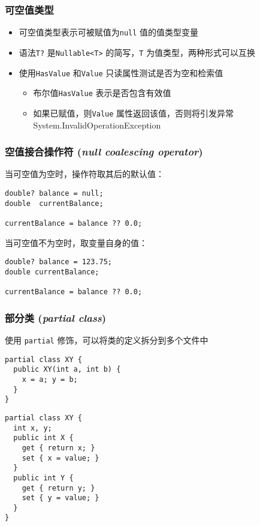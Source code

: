 \begin{frame}[fragile]
\frametitle{可空值类型}
\begin{itemize}
\item 可空值类型表示可被赋值为\texttt{null} 值的值类型变量
\item 语法\texttt{T?} 是\lstinline|Nullable<T>| 的简写，\texttt{T} 为值类型，两种形式可以互换
\item 使用\texttt{HasValue} 和\texttt{Value} 只读属性测试是否为空和检索值
\begin{itemize}
\item 布尔值\texttt{HasValue} 表示是否包含有效值
\item 如果已赋值，则\texttt{Value} 属性返回该值，否则将引发异常 System.InvalidOperationException 
\end{itemize}
\end{itemize}
\end{frame}

\begin{frame}[fragile]
\frametitle{空值接合操作符 (\textit{null coalescing operator})}
当可空值为空时，操作符取其后的默认值：
\begin{lstlisting}
double? balance = null;
double  currentBalance;

currentBalance = balance ?? 0.0;
\end{lstlisting}

当可空值不为空时，取变量自身的值：
\begin{lstlisting}
double? balance = 123.75;
double currentBalance;

currentBalance = balance ?? 0.0;
\end{lstlisting}
\end{frame}

\begin{frame}[fragile]
\frametitle{部分类 (\textit{partial class})}
使用 \texttt{partial} 修饰，可以将类的定义拆分到多个文件中
\begin{lstlisting}
partial class XY {
  public XY(int a, int b) {
    x = a; y = b;
  }
}
\end{lstlisting}
\begin{lstlisting}
partial class XY {
  int x, y;
  public int X {
    get { return x; }
    set { x = value; }
  }
  public int Y {
    get { return y; }
    set { y = value; }
  }
}

\end{lstlisting}
\end{frame}

